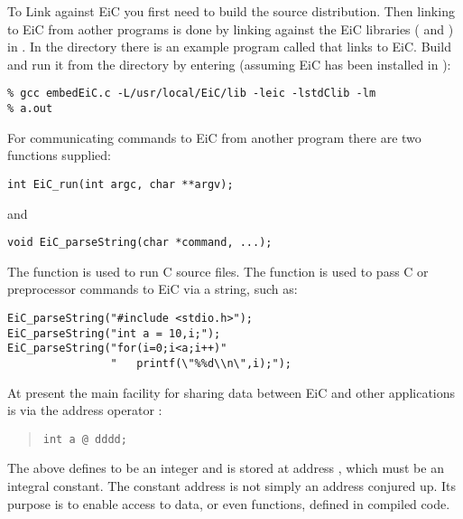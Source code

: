 To Link against EiC you first need to build the source distribution.
Then linking to EiC from aother programs is done by linking against
the EiC libraries ( and ) in . In
the directory  there is an example program called
 that links to EiC. Build and run it from the
 directory by entering (assuming EiC has been
installed in ):

\begin{production}
\begin{verbatim}
% gcc embedEiC.c -L/usr/local/EiC/lib -leic -lstdClib -lm  
% a.out
\end{verbatim}
\end{production}	
 For  communicating commands to EiC from another program there are two
functions supplied:
\begin{production}
\begin{verbatim}
int EiC_run(int argc, char **argv);
\end{verbatim}
\end{production}
 and
\begin{production}
\begin{verbatim}
void EiC_parseString(char *command, ...);
\end{verbatim}
\end{production}

The  function is used to run C source files. The
 function is used to pass C or preprocessor commands
to EiC via a string, such as:
\begin{production}
\begin{verbatim}
EiC_parseString("#include <stdio.h>");
EiC_parseString("int a = 10,i;");
EiC_parseString("for(i=0;i<a;i++)"
                "	printf(\"%%d\\n\",i);");
\end{verbatim}
\end{production}
At present the main facility for sharing data between EiC and
other applications is via the address operator :

\begin{quote}
\begin{verbatim}
int a @ dddd;
\end{verbatim}
\end{quote}

The above defines  to be an integer and is stored at address ,
which must be an integral constant. The constant address  is
not simply an address conjured up. Its purpose is to enable access to
data, or even functions, defined in compiled code. 

